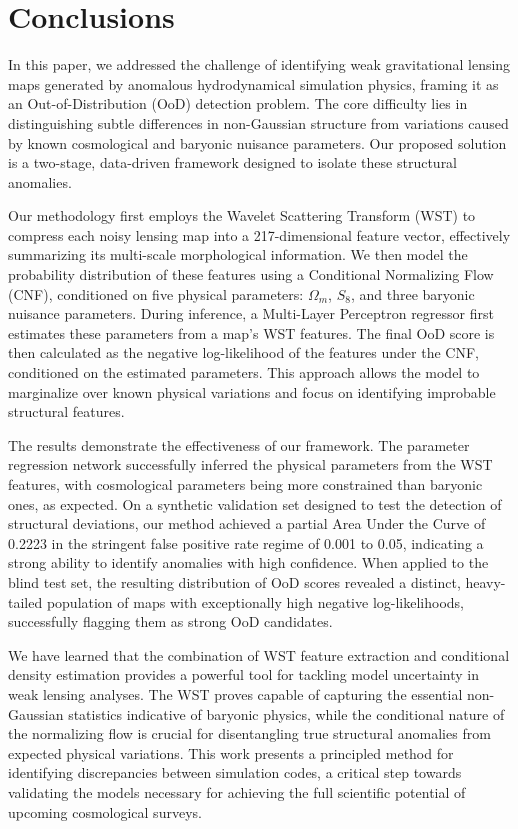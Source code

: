 \documentclass[]{article}
\begin{document}
\section{Conclusions}
\label{sec:conclusions}
In this paper, we addressed the challenge of identifying weak gravitational lensing maps generated by anomalous hydrodynamical simulation physics, framing it as an Out-of-Distribution (OoD) detection problem. The core difficulty lies in distinguishing subtle differences in non-Gaussian structure from variations caused by known cosmological and baryonic nuisance parameters. Our proposed solution is a two-stage, data-driven framework designed to isolate these structural anomalies.

Our methodology first employs the Wavelet Scattering Transform (WST) to compress each noisy lensing map into a 217-dimensional feature vector, effectively summarizing its multi-scale morphological information. We then model the probability distribution of these features using a Conditional Normalizing Flow (CNF), conditioned on five physical parameters: $\Omega_m$, $S_8$, and three baryonic nuisance parameters. During inference, a Multi-Layer Perceptron regressor first estimates these parameters from a map's WST features. The final OoD score is then calculated as the negative log-likelihood of the features under the CNF, conditioned on the estimated parameters. This approach allows the model to marginalize over known physical variations and focus on identifying improbable structural features.

The results demonstrate the effectiveness of our framework. The parameter regression network successfully inferred the physical parameters from the WST features, with cosmological parameters being more constrained than baryonic ones, as expected. On a synthetic validation set designed to test the detection of structural deviations, our method achieved a partial Area Under the Curve of 0.2223 in the stringent false positive rate regime of 0.001 to 0.05, indicating a strong ability to identify anomalies with high confidence. When applied to the blind test set, the resulting distribution of OoD scores revealed a distinct, heavy-tailed population of maps with exceptionally high negative log-likelihoods, successfully flagging them as strong OoD candidates.

We have learned that the combination of WST feature extraction and conditional density estimation provides a powerful tool for tackling model uncertainty in weak lensing analyses. The WST proves capable of capturing the essential non-Gaussian statistics indicative of baryonic physics, while the conditional nature of the normalizing flow is crucial for disentangling true structural anomalies from expected physical variations. This work presents a principled method for identifying discrepancies between simulation codes, a critical step towards validating the models necessary for achieving the full scientific potential of upcoming cosmological surveys.


{}

\end{document}
